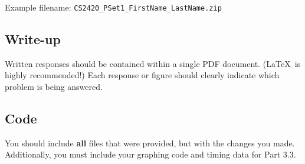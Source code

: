 \documentclass[a4 paper]{article}
\begin{document}
\noindent
Example filename: \texttt{CS2420\_PSet1\_FirstName\_LastName.zip}\\

\subsection*{Write-up}
Written responses should be contained within a single PDF document.
(\LaTeX~is highly recommended!)
Each response or figure should clearly indicate which problem is being answered.

\subsection*{Code}
You should include \textbf{all} files that were provided, but with the changes you made.
Additionally, you must include your graphing code and timing data for Part 3.3.
\end{document}
